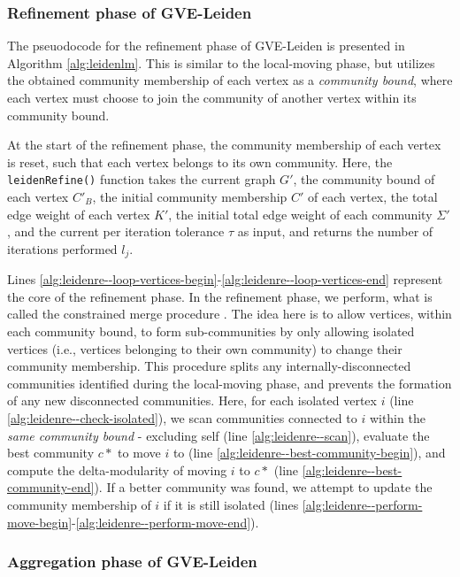\subsubsection{Refinement phase of GVE-Leiden}

The pseuodocode for the refinement phase of GVE-Leiden is presented in Algorithm \ref{alg:leidenlm}. This is similar to the local-moving phase, but utilizes the obtained community membership of each vertex as a \textit{community bound}, where each vertex must choose to join the community of another vertex within its community bound. At the start of the refinement phase, the community membership of each vertex is reset, such that each vertex belongs to its own community. Here, the \texttt{leidenRefine()} function takes the current graph $G'$, the community bound of each vertex $C'_B$, the initial community membership $C'$ of each vertex, the total edge weight of each vertex $K'$, the initial total edge weight of each community $\Sigma'$, and the current per iteration tolerance $\tau$ as input, and returns the number of iterations performed $l_j$.

Lines \ref{alg:leidenre--loop-vertices-begin}-\ref{alg:leidenre--loop-vertices-end} represent the core of the refinement phase. In the refinement phase, we perform, what is called the constrained merge procedure \cite{com-traag19}. The idea here is to allow vertices, within each community bound, to form sub-communities by only allowing isolated vertices (i.e., vertices belonging to their own community) to change their community membership. This procedure splits any internally-disconnected communities identified during the local-moving phase, and prevents the formation of any new disconnected communities. Here, for each isolated vertex $i$ (line \ref{alg:leidenre--check-isolated}), we scan communities connected to $i$ within the \textit{same community bound} - excluding self (line \ref{alg:leidenre--scan}), evaluate the best community $c*$ to move $i$ to (line \ref{alg:leidenre--best-community-begin}), and compute the delta-modularity of moving $i$ to $c*$ (line \ref{alg:leidenre--best-community-end}). If a better community was found, we attempt to update the community membership of $i$ if it is still isolated (lines \ref{alg:leidenre--perform-move-begin}-\ref{alg:leidenre--perform-move-end}).


\subsubsection{Aggregation phase of GVE-Leiden}

